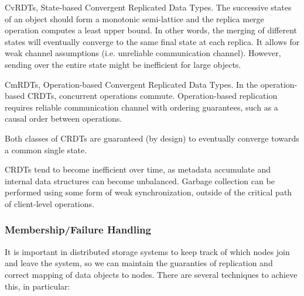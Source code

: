 \begin{description}
	\begin{description}
	\item{CvRDTs, }State-based Convergent Replicated Data Types. The successive states of an object should form a monotonic semi-lattice and the replica merge operation computes a least upper bound. In other words, the merging of different states will eventually converge to the same final state at each replica. It allows for weak channel assumptions (i.e. unreliable communication channel). However, sending over the entire state might be inefficient for large objects.\par
	
	\item{CmRDTs, }Operation-based Convergent Replicated Data Types. In the operation-based CRDTs, concurrent operations commute. Operation-based replication requires reliable communication channel with ordering guarantees, such as a causal order between operations.
	\end{description}
	
	Both classes of CRDTs are guaranteed (by design) to eventually converge towards a common single state.\par
	CRDTs tend to become inefficient over time, as metadata accumulate and internal data structures can become unbalanced\cite{crdt}. Garbage collection can be performed using some form of weak synchronization, outside of the critical path of client-level operations.
	
\end{description}

\subsubsection{Membership/Failure Handling}
\label{sec:membership_failure_handling}
It is important in distributed storage systems to keep track of which nodes join and leave the system, so we can maintain the guaranties of replication and correct mapping of data objects to nodes. There are several techniques to achieve this, in particular:

